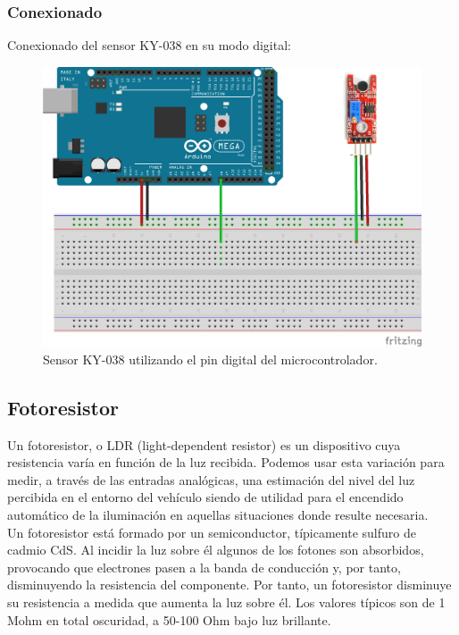 \subsubsection{Conexionado}

Conexionado del sensor KY-038 en su modo digital:

\begin{figure}[H]
  \begin{center}
    \includegraphics[scale=0.6]{imagenes/micro_conexionado.png}
  \end{center}
  \caption{Sensor KY-038 utilizando el pin digital del microcontrolador.}
  \label{figura:mq_2_conexionado}
\end{figure}


\subsection{Fotoresistor}

Un fotoresistor, o LDR (light-dependent resistor) es un dispositivo cuya resistencia varía en función de la luz recibida. Podemos usar esta variación para medir, a través de 
las entradas analógicas, una estimación del nivel del luz percibida en el entorno del vehículo siendo de utilidad para el encendido automático de la iluminación en aquellas situaciones 
donde resulte necesaria.\\

Un fotoresistor está formado por un semiconductor, típicamente sulfuro de cadmio CdS. Al incidir la luz sobre él algunos de los fotones son absorbidos, provocando que electrones pasen
a la banda de conducción y, por tanto, disminuyendo la resistencia del componente. Por tanto, un fotoresistor disminuye su resistencia a medida que aumenta la luz sobre él.
Los valores típicos son de 1 Mohm en total oscuridad, a 50-100 Ohm bajo luz brillante.\\


